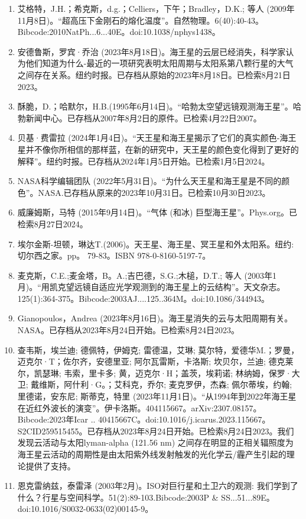 \begin{enumerate}
\item 艾格特，J.H.；希克斯，d.g.；Celliers，下午；Bradley，D.K.; 等人 (2009年11月8日)。“超高压下金刚石的熔化温度”。自然物理。6(40):40-43。Bibcode:2010NatPh...6...40E。doi:10.1038/nphys1438。
\item 安德鲁斯，罗宾·乔治 (2023年8月18日)。海王星的云层已经消失，科学家认为他们知道为什么-最近的一项研究表明太阳周期与太阳系第八颗行星的大气之间存在关系。纽约时报。已存档从原始的2023年8月18日。已检索8月21日2023。
\item 酥脆，D.；哈默尔，H.B.(1995年6月14日)。“哈勃太空望远镜观测海王星”。哈勃新闻中心。已存档从2007年8月2日的原件。已检索4月22日2007。
\item 贝基·费雷拉 (2024年1月4日)。“天王星和海王星揭示了它们的真实颜色-海王星并不像你所相信的那样蓝，在新的研究中，天王星的颜色变化得到了更好的解释”。纽约时报。已存档从2024年1月5日开始。已检索1月5日2024。
\item NASA科学编辑团队 (2022年5月31日)。“为什么天王星和海王星是不同的颜色”。NASA.已存档从原来的2023年10月31日。已检索10月30日2023。
\item 威廉姆斯，马特 (2015年9月14日)。“气体 (和冰) 巨型海王星”。Phys.org。已检索8月27日2024。
\item 埃尔金斯-坦顿，琳达T.(2006)。天王星、海王星、冥王星和外太阳系。纽约: 切尔西之家。pp。 79-83。ISBN 978-0-8160-5197-7。
\item 麦克斯，C.E.;麦金塔，B。A.;吉巴德，S.G.;木槌，D.T.; 等人 (2003年1月)。“用凯克望远镜自适应光学观测到的海王星上的云结构”。天文杂志。125(1):364-375。Bibcode:2003AJ....125..364M。doi:10.1086/344943。
\item Gianopoulos，Andrea (2023年8月16日)。海王星消失的云与太阳周期有关。NASA。已存档从2023年8月24日开始。已检索8月24日2023。
\item 查韦斯，埃兰迪; 德佩特，伊姆克; 雷德温，艾琳; 莫尔特，爱德华M.；罗曼，迈克尔·T；佐尔齐，安德里亚; 阿尔瓦雷斯，卡洛斯; 坎贝尔，兰迪; 德克莱尔，凯瑟琳; 韦索，里卡多; 黄，迈克尔·H；盖茨，埃莉诺; 林纳姆，保罗·大卫; 戴维斯，阿什利·G。；艾科克，乔尔; 麦克罗伊，杰森; 佩尔蒂埃，约翰; 里德诺，安东尼; 斯蒂克，特里 (2023年11月1日)。“从1994年到2022年海王星在近红外波长的演变”。伊卡洛斯。404115667。arXiv:2307.08157。Bibcode:2023年Icar .. 40415667C。doi:10.1016/j.icarus.2023.115667。S2CID259515455。已存档从2023年8月24日开始。已检索8月24日2023。我们发现云活动与太阳lyman-alpha (121.56 nm) 之间存在明显的正相关辐照度为海王星云活动的周期性是由太阳紫外线发射触发的光化学云/霾产生引起的理论提供了支持。 
\item 恩克雷纳兹，泰雷泽 (2003年2月)。ISO对巨行星和土卫六的观测: 我们学到了什么？行星与空间科学。51(2):89-103.Bibcode:2003P & SS...51...89E。doi:10.1016/S0032-0633(02)00145-9。

\end{enumerate}
